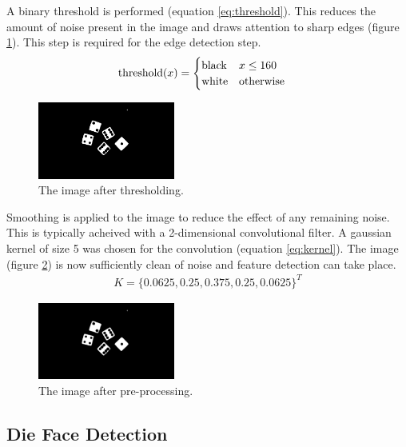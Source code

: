 \documentclass[conference]{IEEEtran}
\begin{document}
A binary threshold is performed (equation \ref{eq:threshold}).
This reduces the amount of noise present in the image and draws attention to sharp edges (figure \ref{fig:threshold}).
This step is required for the edge detection step.
\begin{align}
	\textnormal{threshold}(x) &= \begin{cases}
		\textnormal{black} & x \leq 160 \\
		\textnormal{white} & \textnormal{otherwise}
	\end{cases} \label{eq:threshold}
\end{align}
\begin{figure}
	\centering
	\includegraphics[width=0.4\textwidth]{threshold}
	\caption{The image after thresholding.}
	\label{fig:threshold}
\end{figure}

Smoothing is applied to the image to reduce the effect of any remaining noise.
This is typically acheived with a 2-dimensional convolutional filter.
A gaussian kernel of size 5 was chosen for the convolution (equation \ref{eq:kernel}). 
The image (figure \ref{fig:blurred}) is now sufficiently clean of noise and feature detection can take place.
\begin{align}
	K = \{0.0625, 0.25, 0.375, 0.25, 0.0625\}^T \label{eq:kernel}
\end{align}
\begin{figure}
	\centering
	\includegraphics[width=0.4\textwidth]{blur}
	\caption{The image after pre-processing.}
	\label{fig:blurred}
\end{figure}

\subsection{Die Face Detection}
\end{document}
